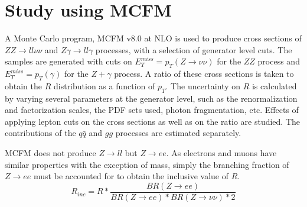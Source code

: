 \documentclass[11pt,a4paper]{report}
\newcommand{\ZZ}{$ZZ\to ll\nu\nu$ }
\newcommand{\Zg}{$Z\gamma\to ll\gamma$ }
\begin{document}
\chapter{Study using MCFM}
A Monte Carlo program, MCFM v8.0 \cite{MCFM} at NLO is used to produce cross sections of \ZZ and \Zg processes, with a selection of generator level cuts. The samples are generated with cuts on $E_T^{miss} = p_T(Z\to \nu\nu)$ for the $ZZ$ process and $E_T^{miss} = p_T(\gamma)$ for the $Z+\gamma$ process. A ratio of these cross sections is taken to obtain the $R$ distribution as a function of $p_T$. The uncertainty on $R$ is calculated by varying several parameters at the generator level, such as the renormalization and factorization scales, the PDF sets used, photon fragmentation, etc. Effects of applying lepton cuts on the cross sections as well as on the ratio are studied. The contributions of the $q \bar{q}$ and $gg$ processes are estimated separately.

MCFM does not produce $Z\rightarrow ll$ but $Z\rightarrow ee$. As electrons and muons have similar properties with the exception of mass, simply the branching fraction of $Z\rightarrow ee$ must be accounted for to obtain the inclusive value of $R$.
\begin{equation}\label{eq:R_inc}
	R_{inc} = R * \frac{BR(Z\rightarrow ee)}{BR(Z \rightarrow ee)*BR(Z\rightarrow \nu\nu)*2}
\end{equation}
\end{document}
